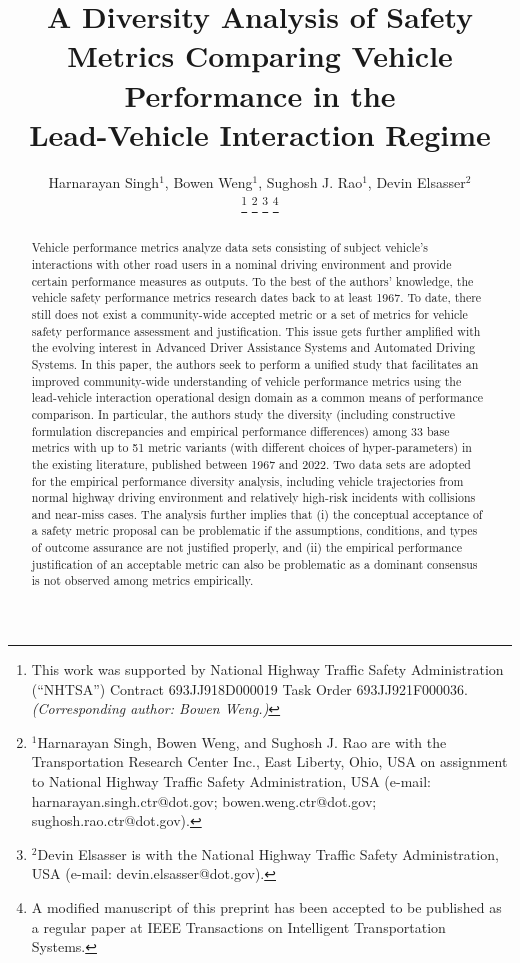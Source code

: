 \documentclass[journal]{IEEEtran}
\begin{document}
\title{A Diversity Analysis of Safety Metrics Comparing Vehicle Performance in the \\ Lead-Vehicle Interaction Regime}

\author{Harnarayan Singh$^{1}$, Bowen Weng$^{1}$, Sughosh J. Rao$^{1}$, Devin Elsasser$^{2}$%

\thanks{This work was supported by National Highway Traffic Safety Administration (“NHTSA”) Contract 693JJ918D000019 Task Order 693JJ921F000036. \textit{(Corresponding author: Bowen Weng.)}}%
\thanks{$^{1}$Harnarayan Singh, Bowen Weng, and Sughosh J. Rao are with the Transportation Research Center Inc., East Liberty, Ohio, USA on assignment to National Highway Traffic Safety Administration, USA (e-mail: harnarayan.singh.ctr@dot.gov; bowen.weng.ctr@dot.gov; sughosh.rao.ctr@dot.gov).}%
\thanks{$^{2}$Devin Elsasser is with the National Highway Traffic Safety Administration, USA (e-mail: devin.elsasser@dot.gov).}%
\thanks{A modified manuscript of this preprint has been accepted to be published as a regular paper at IEEE Transactions on Intelligent Transportation Systems.}
}


\maketitle

\begin{abstract}
Vehicle performance metrics analyze data sets consisting of subject vehicle’s interactions with other road users in a nominal driving environment and provide certain performance measures as outputs. To the best of the authors' knowledge, the vehicle safety performance metrics research dates back to at least 1967. To date, there still does not exist a community-wide accepted metric or a set of metrics for vehicle safety performance assessment and justification. This issue gets further amplified with the evolving interest in Advanced Driver Assistance Systems and Automated Driving Systems. In this paper, the authors seek to perform a unified study that facilitates an improved community-wide understanding of vehicle performance metrics using the lead-vehicle interaction operational design domain as a common means of performance comparison. In particular, the authors study the diversity (including constructive formulation discrepancies and empirical performance differences) among 33 base metrics with up to 51 metric variants (with different choices of hyper-parameters) in the existing literature, published between 1967 and 2022. Two data sets are adopted for the empirical performance diversity analysis, including vehicle trajectories from normal highway driving environment and relatively high-risk incidents with collisions and near-miss cases. The analysis further implies that (i) the conceptual acceptance of a safety metric proposal can be problematic if the assumptions, conditions, and types of outcome assurance are not justified properly, and (ii) the empirical performance justification of an acceptable metric can also be problematic as a dominant consensus is not observed among metrics empirically.
\end{abstract}
\end{document}
